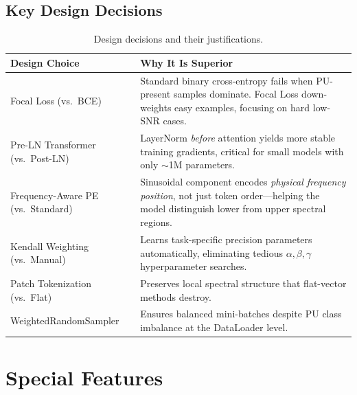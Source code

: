 \documentclass[12pt,a4paper]{article}
\begin{document}
\subsection{Key Design Decisions}

\begin{table}[H]\centering
\begin{tabular}{@{}p{4.5cm}p{8.5cm}@{}}\toprule
\textbf{Design Choice} & \textbf{Why It Is Superior} \\\midrule
Focal Loss (vs.\ BCE) & Standard binary cross-entropy fails when PU-present samples dominate. Focal Loss down-weights easy examples, focusing on hard low-SNR cases. \\[0.3em]
Pre-LN Transformer (vs.\ Post-LN) & LayerNorm \textit{before} attention yields more stable training gradients, critical for small models with only $\sim$1M parameters. \\[0.3em]
Frequency-Aware PE (vs.\ Standard) & Sinusoidal component encodes \textit{physical frequency position}, not just token order---helping the model distinguish lower from upper spectral regions. \\[0.3em]
Kendall Weighting (vs.\ Manual) & Learns task-specific precision parameters automatically, eliminating tedious $\alpha,\beta,\gamma$ hyperparameter searches. \\[0.3em]
Patch Tokenization (vs.\ Flat) & Preserves local spectral structure that flat-vector methods destroy. \\[0.3em]
WeightedRandomSampler & Ensures balanced mini-batches despite PU class imbalance at the DataLoader level. \\
\bottomrule
\end{tabular}
\caption{Design decisions and their justifications.}
\end{table}

\section{Special Features}
\end{document}
